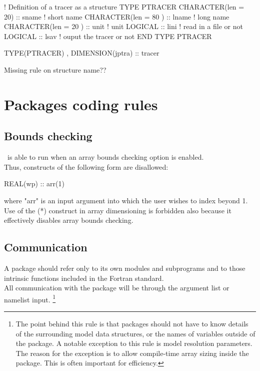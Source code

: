 \begin{forlines}
! Definition of a tracer as a structure
TYPE PTRACER
   CHARACTER(len = 20)  :: sname  ! short name
   CHARACTER(len = 80 ) :: lname  ! long name
   CHARACTER(len = 20 ) :: unit   ! unit
   LOGICAL              :: lini   ! read in a file or not
   LOGICAL              :: lsav   ! ouput the tracer or not
END TYPE PTRACER

TYPE(PTRACER) , DIMENSION(jptra) :: tracer
\end{forlines}

Missing rule on structure name??

\section{Packages coding rules}

\subsection{Bounds checking}

\NEMO\ is able to run when an array bounds checking option is enabled. \\
Thus, constructs of the following form are disallowed:

\begin{forlines}
REAL(wp) :: arr(1)
\end{forlines}

where "arr" is an input argument into which the user wishes to index beyond 1.
Use of the (*) construct in array dimensioning is forbidden also because
it effectively disables array bounds checking.

\subsection{Communication}

A package should refer only to its own modules and subprograms and to those intrinsic functions included in
the Fortran standard. \\
All communication with the package will be through the argument list or namelist input.
\footnote{
  The point behind this rule is that packages should not have to know details of
  the surrounding model data structures, or the names of variables outside of the package.
  A notable exception to this rule is model resolution parameters.
  The reason for the exception is to allow compile-time array sizing inside the package.
  This is often important for efficiency.
}

